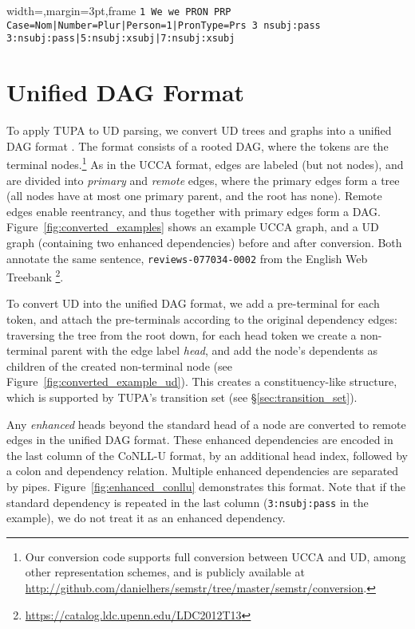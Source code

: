 \documentclass[11pt,a4paper]{article}
\begin{document}
\begin{figure*}[!t]
\begin{adjustbox}{width=\textwidth,margin=3pt,frame}
\texttt{1 We we PRON PRP Case=Nom|Number=Plur|Person=1|PronType=Prs 3 nsubj:pass 3:nsubj:pass|5:nsubj:xsubj|7:nsubj:xsubj}
\end{adjustbox}
\cprotect\caption{Example line from CoNLL-U file with two enhanced dependencies:
\verb|5:nsubj:xsubj| and \verb|7:nsubj:xsubj|.}\label{fig:enhanced_conllu}
\end{figure*}


\section{Unified DAG Format}\label{sec:format}

To apply TUPA to UD parsing,
we convert UD trees and graphs into a unified DAG format \cite{hershcovich2018multitask}.
The format consists of a rooted DAG, where the tokens are the terminal
nodes.\footnote{Our conversion code supports full conversion between UCCA and UD,
among other representation schemes,
and is publicly available at \url{http://github.com/danielhers/semstr/tree/master/semstr/conversion}.}
As in the UCCA format, edges are labeled (but not nodes),
and are divided into \textit{primary} and \textit{remote} edges,
where the primary edges form a tree (all nodes have at most one primary parent,
and the root has none).
Remote edges enable reentrancy, and thus together with primary edges
form a DAG.
Figure~\ref{fig:converted_examples} shows an example UCCA graph,
and a UD graph (containing two enhanced dependencies) before and after conversion.
Both annotate the same sentence, \verb|reviews-077034-0002| from the
English Web Treebank \cite{L14-1067}\footnote{\url{https://catalog.ldc.upenn.edu/LDC2012T13}}.

To convert UD into the unified DAG format,
we add a pre-terminal for each token,
and attach the pre-terminals according to the original dependency edges:
traversing the tree from the root down, for each head token we create a non-terminal
parent with the edge label {\it head},
and add the node's dependents as children of the created non-terminal node
(see Figure~\ref{fig:converted_example_ud}).
This creates a constituency-like structure,
which is supported by TUPA's transition set (see \S\ref{sec:transition_set}).

Any \textit{enhanced}
heads beyond the standard head of a node are converted to remote edges in the unified DAG format.
These enhanced dependencies are encoded in the last column of the \mbox{CoNLL-U} format,
by an additional head index, followed by a colon and dependency relation.
Multiple enhanced dependencies are separated by pipes.
Figure~\ref{fig:enhanced_conllu} demonstrates this format.
Note that if the standard dependency is repeated in the last column
(\verb|3:nsubj:pass| in the example), we do not treat it as an enhanced dependency.
\end{document}
